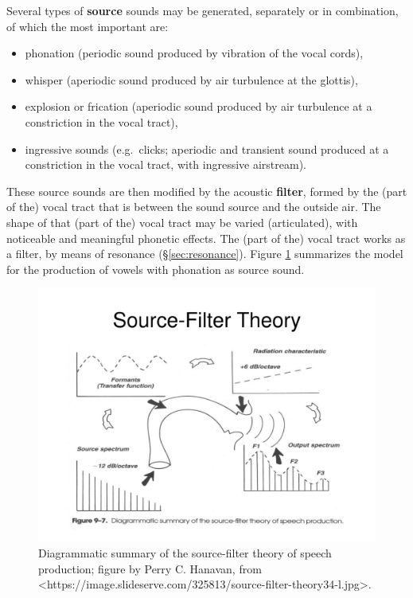 \documentclass[
]{book}
\begin{document}
Several types of \textbf{source} sounds may be generated, separately or in combination, of which the most important are:

\begin{itemize}
\item
  phonation (periodic sound produced by vibration of the vocal cords),
\item
  whisper (aperiodic sound produced by air turbulence at the glottis),
\item
  explosion or frication (aperiodic sound produced by air turbulence at a constriction in the vocal tract),
\item
  ingressive sounds (e.g.~clicks; aperiodic and transient sound produced at a constriction in the vocal tract, with ingressive airstream).
\end{itemize}

These source sounds are then modified by the acoustic \textbf{filter}, formed by the (part of the) vocal tract that is between the sound source and the outside air. The shape of that (part of the) vocal tract may be varied (articulated), with noticeable and meaningful phonetic effects. The (part of the) vocal tract works as a filter, by means of resonance (§\ref{sec:resonance}). Figure \ref{fig:source-filter} summarizes the model for the production of vowels with phonation as source sound.

\begin{figure}

{\centering \includegraphics{figures/source-filter-theory34-l} 

}

\caption{Diagrammatic summary of the source-filter theory of speech production; figure by Perry C. Hanavan, from <https://image.slideserve.com/325813/source-filter-theory34-l.jpg>.}\label{fig:source-filter}
\end{figure}
\end{document}
